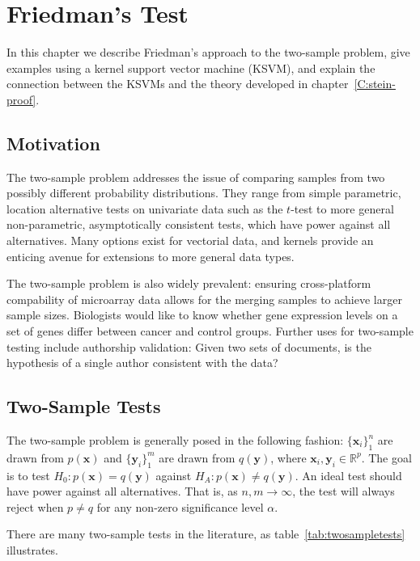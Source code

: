 \graphicspath{{./friedman-test/img/}}
\chapter{Friedman's Test}
\label{C:friedman-test}
In this chapter we describe Friedman's approach to the two-sample
problem, give examples using a kernel support vector machine (KSVM), and
explain the connection between the KSVMs and the theory developed in
chapter~\ref{C:stein-proof}.

\section{Motivation}
The two-sample problem addresses the issue of comparing samples from
two possibly different probability distributions.  They range from
simple parametric, location alternative tests on univariate data such as the
$t$-test to more general non-parametric, asymptotically consistent tests, which
have power against all alternatives.  Many options exist for vectorial
data, and kernels provide an enticing avenue for extensions to more
general data types.

The two-sample problem is also widely prevalent: ensuring
cross-platform compability of microarray data allows for the merging
samples to achieve larger sample sizes.  Biologists would like to know
whether gene expression levels on a set of genes differ between cancer
and control groups.  Further uses for two-sample testing include
authorship validation: Given two sets of documents, is the hypothesis
of a single author consistent with the data?

\section{Two-Sample Tests}
The two-sample problem is generally posed in the following fashion: $\{
\mathbf{x}_i\}_1^n$ are drawn from $p(\mathbf{x})$ and
$\{\mathbf{y}_i\}_1^m$ are drawn from $q(\mathbf{y})$, where $\mathbf{x}_i,
\mathbf{y}_i \in \mathbb{R}^p$. The goal is to test $H_0:
p(\mathbf{x}) = q(\mathbf{y})$ against $H_A: p(\mathbf{x}) \neq
q(\mathbf{y})$. An ideal test should have power against all
alternatives. That is, as $n,m \to \infty$, the test
will always reject when $p \neq q$ for any non-zero significance level
$\alpha$. 

There are many two-sample tests in the literature, as
table~\ref{tab:twosampletests} illustrates.  

